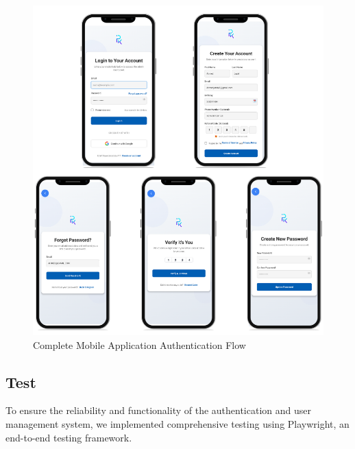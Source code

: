 \begin{figure}[htbp]
    \centering
    \includegraphics[width=1\textwidth]{images/mobile auth.png}
    \caption{Complete Mobile Application Authentication Flow}
    \label{fig:mobile-auth-interfaces}
\end{figure}

\newpage

\subsection{Test}
To ensure the reliability and functionality of the authentication and user management system, we implemented comprehensive testing using Playwright, an end-to-end testing framework.

